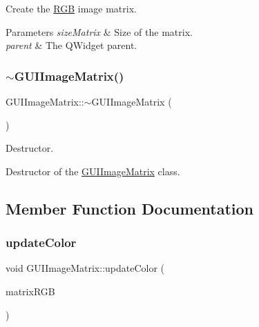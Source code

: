 Create the \mbox{\hyperlink{class_r_g_b}{R\+GB}} image matrix. 


\begin{DoxyParams}{Parameters}
{\em size\+Matrix} & Size of the matrix. \\
\hline
{\em parent} & The Q\+Widget parent. \\
\hline
\end{DoxyParams}
\mbox{\label{class_g_u_i_image_matrix_af36fa210852ae587d91697c3cb4d148b}} 
\subsubsection{\texorpdfstring{$\sim$\+G\+U\+I\+Image\+Matrix()}{~GUIImageMatrix()}}
{\footnotesize\ttfamily G\+U\+I\+Image\+Matrix\+::$\sim$\+G\+U\+I\+Image\+Matrix (\begin{DoxyParamCaption}{ }\end{DoxyParamCaption})}



Destructor. 

Destructor of the \mbox{\hyperlink{class_g_u_i_image_matrix}{G\+U\+I\+Image\+Matrix}} class. 

\subsection{Member Function Documentation}
\mbox{\label{class_g_u_i_image_matrix_a6aad00f51bc456d20dca7a53519cc623}} 
\subsubsection{\texorpdfstring{update\+Color}{updateColor}}
{\footnotesize\ttfamily void G\+U\+I\+Image\+Matrix\+::update\+Color (\begin{DoxyParamCaption}\item[{const \mbox{\hyperlink{class_matrix}{Matrix}}$<$ \mbox{\hyperlink{class_r_g_b}{R\+GB}} $>$ \&}]{matrix\+R\+GB }\end{DoxyParamCaption})\hspace{0.3cm}{\ttfamily [slot]}}



